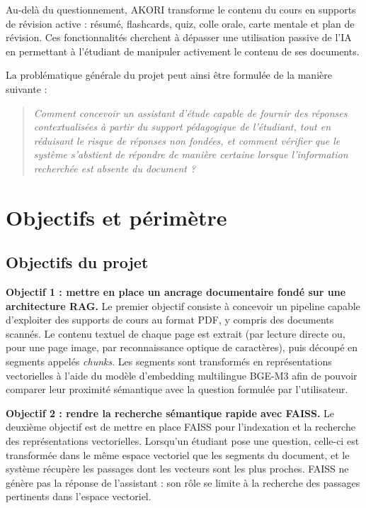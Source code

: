\documentclass[12pt,a4paper,oneside]{report}
\begin{document}
Au-delà du questionnement, AKORI transforme le contenu du cours en supports de révision active : résumé, flashcards, quiz, colle orale, carte mentale et plan de révision. Ces fonctionnalités cherchent à dépasser une utilisation passive de l'IA en permettant à l'étudiant de manipuler activement le contenu de ses documents.

La problématique générale du projet peut ainsi être formulée de la manière suivante :

\begin{quote}
\emph{Comment concevoir un assistant d'étude capable de fournir des réponses contextualisées à partir du support pédagogique de l'étudiant, tout en réduisant le risque de réponses non fondées, et comment vérifier que le système s'abstient de répondre de manière certaine lorsque l'information recherchée est absente du document ?}
\end{quote}

\section{Objectifs et périmètre}

\subsection{Objectifs du projet}

\textbf{Objectif 1 : mettre en place un ancrage documentaire fondé sur une architecture RAG.}
Le premier objectif consiste à concevoir un pipeline capable d'exploiter des supports de cours au format PDF, y compris des documents scannés. Le contenu textuel de chaque page est extrait (par lecture directe ou, pour une page image, par reconnaissance optique de caractères), puis découpé en segments appelés \emph{chunks}. Les segments sont transformés en représentations vectorielles à l'aide du modèle d'embedding multilingue BGE-M3 \cite{chen2024bgem3} afin de pouvoir comparer leur proximité sémantique avec la question formulée par l'utilisateur.

\textbf{Objectif 2 : rendre la recherche sémantique rapide avec FAISS.}
Le deuxième objectif est de mettre en place FAISS pour l'indexation et la recherche des représentations vectorielles. Lorsqu'un étudiant pose une question, celle-ci est transformée dans le même espace vectoriel que les segments du document, et le système récupère les passages dont les vecteurs sont les plus proches. FAISS ne génère pas la réponse de l'assistant : son rôle se limite à la recherche des passages pertinents dans l'espace vectoriel.
\end{document}
